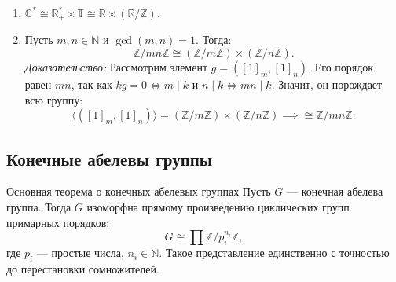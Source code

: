 \begin{Example}{}{}
	\begin{enumerate}
		\item $\mathbb{C}^* \cong \mathbb{R}^*_+ \times \mathbb{T} \cong \mathbb{R} \times (\mathbb{R}/\mathbb{Z})$.
		\item Пусть $m, n \in \mathbb{N}$ и $\gcd(m, n) = 1$. Тогда:
		\[
		\mathbb{Z}/mn\mathbb{Z} \cong (\mathbb{Z}/m\mathbb{Z}) \times (\mathbb{Z}/n\mathbb{Z}).
		\]
		\textit{Доказательство:} Рассмотрим элемент $g = ([1]_m, [1]_n)$. Его порядок равен $mn$, так как $kg = 0 \Leftrightarrow m \mid k$ и $n \mid k \Leftrightarrow mn \mid k$. Значит, он порождает всю группу:
		\[
		\langle ([1]_m, [1]_n) \rangle = (\mathbb{Z}/m\mathbb{Z}) \times (\mathbb{Z}/n\mathbb{Z}) \implies \cong \mathbb{Z}/mn\mathbb{Z}.
		\]
	\end{enumerate}
\end{Example}

\subsection{Конечные абелевы группы}

\begin{Theorem}{Основная теорема о конечных абелевых группах}{}
	Пусть $G$ --- конечная абелева группа. Тогда $G$ изоморфна прямому произведению циклических групп примарных порядков:
	\[
	G \cong \prod \mathbb{Z}/p_i^{n_i}\mathbb{Z},
	\]
	где $p_i$ --- простые числа, $n_i \in \mathbb{N}$. Такое представление единственно с точностью до перестановки сомножителей.
\end{Theorem}

